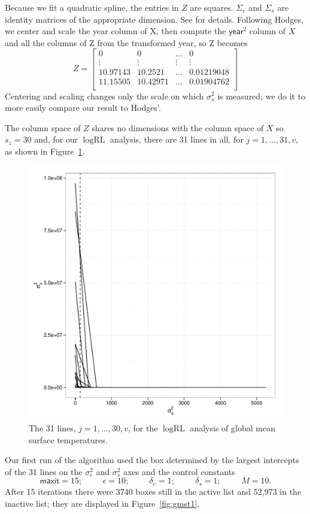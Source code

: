 \documentclass{report}
\newcommand{\textcompute}{\textsf}
\newcommand{\RLorig}{\text{RL}}
\newcommand{\logRLorig}{\log\RLorig}
\newcommand{\sigssq}{\sigma_s^2}
\newcommand{\sigesq}{\sigma_e^2}
\newcommand{\maxit}{\textcompute{maxit}}
\begin{document}
Because we fit a quadratic spline, the entries in $Z$ are squares.  $\Sigma_e$ and $\Sigma_s$ are identity matrices of the appropriate dimension.  See \cite{hodges:2013} for details.  Following Hodges, we center and scale the \textcompute{year} column of X, then compute the $\textcompute{year}^2$ column of $X$ and all the columns of Z from the transformed \textcompute{year}, so Z becomes
\begin{equation*}
Z =	\begin{bmatrix} 
		0 & 0 & \dots & 0\\
		\vdots & \vdots & \vdots & \vdots\\
		10.97143 & 10.2521 & \dots & 0.01219048\\
		11.15505 & 10.42971 & \dots & 0.01904762\\
	\end{bmatrix}
\end{equation*}
Centering and scaling changes only the scale on which $\sigssq$ is measured; we do it to more easily compare our result to Hodges'.

The column space of $Z$ shares no dimensions with the column space of $X$ so $s_z=30$ and, for our $\logRLorig$ analysis, there are 31 lines in all, for $j=1,\dots,31, v$, as shown in Figure~\ref{fig:gmst-lines}.
\begin{figure}
	\centering
	\includegraphics[width=.5\linewidth]{figs/gmst-lines.pdf}
	\caption{The 31 lines, $j=1, \dots, 30, v$, for the $\logRLorig$ analysis of
	              global mean surface temperatures.}
	\label{fig:gmst-lines}
\end{figure}
Our first run of the algorithm used the box determined by the largest intercepts of the 31 lines on the $\sigesq$ and $\sigssq$ axes and the control constants 
\begin{equation*}
	\maxit=15; \hspace{1cm} \epsilon=10; \hspace{1cm}
	\delta_e=1; \hspace{1cm} \delta_s=1; \hspace{1cm} M=10.
\end{equation*}
After 15 iterations there were 3740 boxes still in the active list and 52,973 in the inactive list; they are displayed in Figure~\ref{fig:gmst1}.
\end{document}
